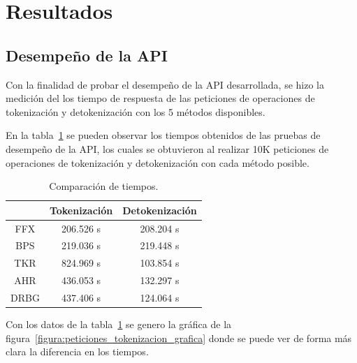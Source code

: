 %
%
%

\section{Resultados}
\label{sec:resultados_api}

\subsection{Desempeño de la API}
\label{sec:comparacion_api}

Con la finalidad de probar el desempeño de la API desarrollada, se hizo la
medición del los tiempo de respuesta de las peticiones de operaciones de
tokenización y detokenización con los 5 métodos disponibles.

En la tabla~\ref{tabla:tiempos_peticiones_tokenizacion} se pueden observar
los tiempos obtenidos de las pruebas de desempeño de la API, los cuales se
obtuvieron al realizar 10K peticiones de operaciones de tokenización y
detokenización con cada método posible.

\begin{table}
  \begin{center}
    \begin{tabular}{c|c|c|}
      \cline{2-3}
      & Tokenización & Detokenización \\
      \hline
      \multicolumn{1}{|c|}{FFX}
        & 206.526 s & 208.204 s \\\hline
      \multicolumn{1}{|c|}{BPS}
        & 219.036 s & 219.448 s \\\hline
      \multicolumn{1}{|c|}{TKR}
        & 824.969 s & 103.854 s \\\hline
      \multicolumn{1}{|c|}{AHR}
        & 436.053 s & 132.297 s \\\hline
      \multicolumn{1}{|c|}{DRBG}
        & 437.406 s & 124.064 s \\\hline
    \end{tabular}
    \caption{Comparación de tiempos.}
    \label{tabla:tiempos_peticiones_tokenizacion}
  \end{center}
\end{table}


Con los datos de la tabla~\ref{tabla:tiempos_peticiones_tokenizacion} se genero
la gráfica de la figura~\ref{figura:peticiones_tokenizacion_grafica} donde se
puede ver de forma más clara la diferencia en los tiempos.

